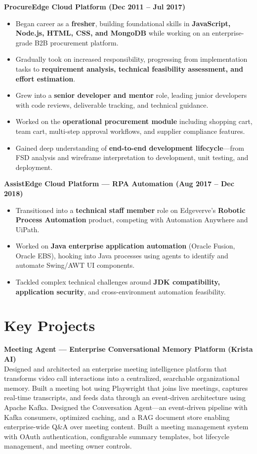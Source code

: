 \documentclass[a4paper,11pt]{article}
\begin{document}
\vspace{4pt}
\textbf{ProcureEdge Cloud Platform (Dec 2011 -- Jul 2017)}
\begin{itemize}[leftmargin=*, nosep]
  \item Began career as a \textbf{fresher}, building foundational skills in \textbf{JavaScript, Node.js, HTML, CSS, and MongoDB} while working on an enterprise-grade B2B procurement platform.
  \item Gradually took on increased responsibility, progressing from implementation tasks to \textbf{requirement analysis, technical feasibility assessment, and effort estimation}.
  \item Grew into a \textbf{senior developer and mentor} role, leading junior developers with code reviews, deliverable tracking, and technical guidance.
  \item Worked on the \textbf{operational procurement module} including shopping cart, team cart, multi-step approval workflows, and supplier compliance features.
  \item Gained deep understanding of \textbf{end-to-end development lifecycle}---from FSD analysis and wireframe interpretation to development, unit testing, and deployment.
\end{itemize}

\vspace{4pt}
\textbf{AssistEdge Cloud Platform --- RPA Automation (Aug 2017 -- Dec 2018)}
\begin{itemize}[leftmargin=*, nosep]
  \item Transitioned into a \textbf{technical staff member} role on Edgeverve's \textbf{Robotic Process Automation} product, competing with Automation Anywhere and UiPath.
  \item Worked on \textbf{Java enterprise application automation} (Oracle Fusion, Oracle EBS), hooking into Java processes using agents to identify and automate Swing/AWT UI components.
  \item Tackled complex technical challenges around \textbf{JDK compatibility, application security}, and cross-environment automation feasibility.
\end{itemize}

\section{Key Projects}

\textbf{Meeting Agent --- Enterprise Conversational Memory Platform (Krista AI)} \\
Designed and architected an enterprise meeting intelligence platform that transforms video call interactions into a centralized, searchable organizational memory. Built a meeting bot using Playwright that joins live meetings, captures real-time transcripts, and feeds data through an event-driven architecture using Apache Kafka. Designed the Conversation Agent---an event-driven pipeline with Kafka consumers, optimized caching, and a RAG document store enabling enterprise-wide Q\&A over meeting content. Built a meeting management system with OAuth authentication, configurable summary templates, bot lifecycle management, and meeting owner controls.
\end{document}
